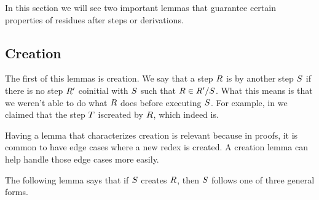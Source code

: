 

In this section we will see two important lemmas that guarantee certain properties
of residues after steps or derivations.

\bigskip
\subsection*{Creation}

The first of this lemmas is creation.
We say that a step $R$ is  by another step $S$ if
there is no step $R'$ coinitial with $S$ such that $R \in R' / S$.
What this means is that we weren't able to do what $R$ does before executing $S$.
For example, in  we claimed
that the step $T$ iscreated by $R$, which indeed is.

Having a lemma that characterizes creation is relevant because in proofs,
it is common to have edge cases where a new redex is created.
A creation lemma can help handle those edge cases more easily.

The following lemma says that if $S$ creates $R$, then $S$ follows
one of three general forms.


